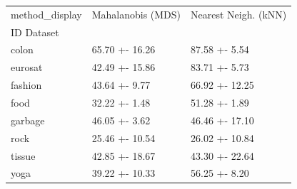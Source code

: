 \begin{tabular}{lll}
\toprule
method_display & Mahalanobis (MDS) & Nearest Neigh. (kNN) \\
ID Dataset &  &  \\
\midrule
colon & 65.70 +- 16.26 & 87.58 +- 5.54 \\
eurosat & 42.49 +- 15.86 & 83.71 +- 5.73 \\
fashion & 43.64 +- 9.77 & 66.92 +- 12.25 \\
food & 32.22 +- 1.48 & 51.28 +- 1.89 \\
garbage & 46.05 +- 3.62 & 46.46 +- 17.10 \\
rock & 25.46 +- 10.54 & 26.02 +- 10.84 \\
tissue & 42.85 +- 18.67 & 43.30 +- 22.64 \\
yoga & 39.22 +- 10.33 & 56.25 +- 8.20 \\
\bottomrule
\end{tabular}
